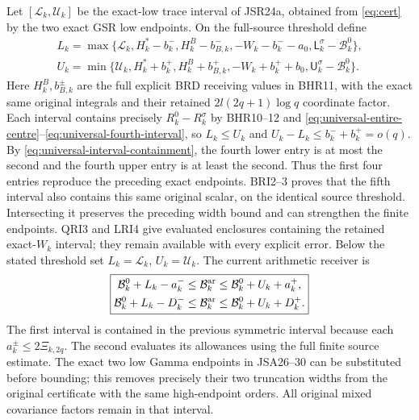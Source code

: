 \documentclass[11pt,a4paper]{article}
\begin{document}
Let $[\mathscr L_k,\mathscr U_k]$ be the exact-low trace
interval of JSR24a, obtained from \eqref{eq:cert} by the two
exact GSR low endpoints. On the full-source threshold define
\begin{equation}
\begin{gathered}
 L_k=\max\{\mathscr L_k,H_k^*-b_k^-,H_k^B-b_{B,k}^-,
                 -W_k-b_k^--a_0,\mathsf L_k^\sigma-\mathcal B_k^0\},\\
 U_k=\min\{\mathscr U_k,H_k^*+b_k^+,H_k^B+b_{B,k}^+,
                 -W_k+b_k^++b_0,\mathsf U_k^\sigma-\mathcal B_k^0\}.
\end{gathered}
\end{equation}
Here $H_k^B,b_{B,k}^\pm$ are the full explicit BRD receiving
values in BHR11, with the exact same original integrals and
their retained $2l(2q+1)\log q$ coordinate factor. Each interval
contains precisely $R_k^0-R_k^\sigma$ by BHR10--12 and
\eqref{eq:universal-entire-centre}--\eqref{eq:universal-fourth-interval},
so $L_k\leq U_k$ and $U_k-L_k\leq b_k^-+b_k^+=o(q)$.
By \eqref{eq:universal-interval-containment}, the fourth lower
entry is at most the second and the fourth upper entry is
at least the second. Thus the first four entries reproduce
the preceding exact endpoints. BRI2--3 proves that the fifth
interval also contains this same original scalar, on the identical
source threshold. Intersecting it preserves the preceding width
bound and can strengthen the finite endpoints. QRI3 and LRI4
give evaluated enclosures containing the retained exact-$W_k$
interval; they remain available with every explicit error.
Below the stated threshold set
$L_k=\mathscr L_k$, $U_k=\mathscr U_k$.
The current arithmetic receiver is
\begin{equation}
 \boxed{\begin{aligned}
 \mathcal B_k^0+L_k-a_k^-&\le\mathcal B_k^{\rm ar}
                         \le\mathcal B_k^0+U_k+a_k^+,\\
 \mathcal B_k^0+L_k-D_k^-&\le\mathcal B_k^{\rm ar}
                         \le\mathcal B_k^0+U_k+D_k^+.
 \end{aligned}}\label{eq:arithmeticinterval}
\end{equation}
The first interval is contained in the previous symmetric interval
because each $a_k^\pm\le2\Xi_{k,2q}$. The second evaluates its
allowances using the full finite source estimate. The exact two low
Gamma endpoints in JSA26--30 can be substituted before bounding;
this removes precisely their two truncation widths from the original
certificate with the same high-endpoint orders. All original mixed covariance factors remain in that interval.
\end{document}
